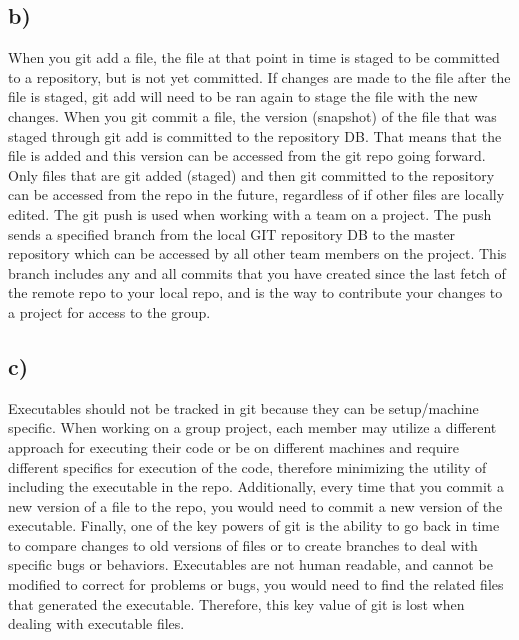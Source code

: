 \documentclass[11pt, oneside]{article}   	%
\begin{document}
\subsection*{b)}
When you git add a file, the file at that point in time is staged to be committed to a repository, but is not yet committed.  If changes are made to the file after the file is staged, git add will need to be ran again to stage the file with the new changes.
\newline
\newline
When you git commit a file, the version (snapshot) of the file that was staged through git add is committed to the repository DB.  That means that the file is added and this version can be accessed from the git repo going forward.  Only files that are git added (staged) and then git committed to the repository can be accessed from the repo in the future, regardless of if other files are locally edited.
\newline
\newline
The git push is used when working with a team on a project.  The push sends a specified branch from the local GIT repository DB to the master repository which can be accessed by all other team members on the project.  This branch includes any and all commits that you have created since the last fetch of the remote repo to your local repo, and is the way to contribute your changes to a project for access to the group.
\subsection*{c)}
Executables should not be tracked in git because they can be setup/machine specific.  When working on a group project, each member may utilize a different approach for executing their code or be on different machines and require different specifics for execution of the code, therefore minimizing the utility of including the executable in the repo.  Additionally, every time that you commit a new version of a file to the repo, you would need to commit a new version of the executable.  Finally, one of the key powers of git is the ability to go back in time to compare changes to old versions of files or to create branches to deal with specific bugs or behaviors.  Executables are not human readable, and cannot be modified to correct for problems or bugs, you would need to find the related files that generated the executable.  Therefore, this key value of git is lost when dealing with executable files.
\end{document}
